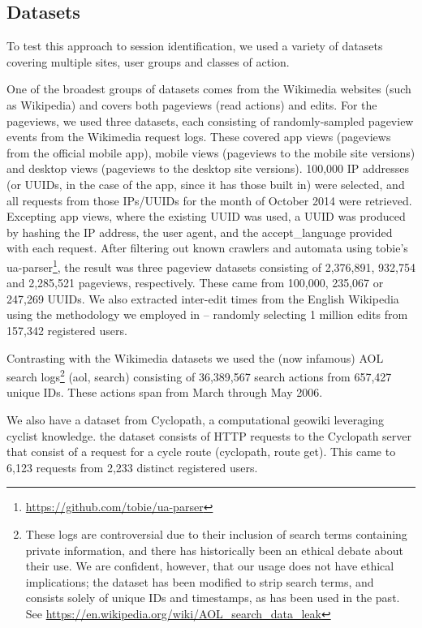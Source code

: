 \subsection{Datasets}
To test this approach to session identification, we used a variety of datasets covering multiple sites, user groups and classes of action.

 One of the broadest groups of datasets comes from the Wikimedia websites (such as Wikipedia) and covers both pageviews (read actions) and edits. For the pageviews, we used three datasets, each consisting of randomly-sampled pageview events from the Wikimedia request logs. These covered app views (pageviews from the official mobile app), mobile views (pageviews to the mobile site versions) and desktop views (pageviews to the desktop site versions). 100,000 IP addresses (or UUIDs, in the case of the app, since it has those built in) were selected, and all requests from those IPs/UUIDs for the month of October 2014 were retrieved. Excepting app views, where the existing UUID was used, a UUID was produced by hashing the IP address, the user agent, and the accept\_language provided with each request. After filtering out known crawlers and automata using tobie’s ua-parser\footnote{\url{https://github.com/tobie/ua-parser}}, the result was three pageview datasets consisting of 2,376,891, 932,754 and 2,285,521 pageviews, respectively. These came from 100,000, 235,067 or 247,269 UUIDs. We also extracted inter-edit times from the English Wikipedia using the methodology we employed in \cite{geiger13measuring} -- randomly selecting 1 million edits from 157,342 registered users.

 Contrasting with the Wikimedia datasets we used the (now infamous) AOL search logs\footnote{These logs are controversial due to their inclusion of search terms containing private information, and there has historically been an ethical debate about their use. We are confident, however, that our usage does not have ethical implications; the dataset has been modified to strip search terms, and consists solely of unique IDs and timestamps, as has been used in the past.\cite{mehrzadi2012onextracting}  See \url{https://en.wikipedia.org/wiki/AOL_search_data_leak}} (aol, search) consisting of 36,389,567 search actions from 657,427 unique IDs. These actions span from March through May 2006.

 We also have a dataset from Cyclopath, a computational geowiki leveraging cyclist knowledge.\cite{priedhorsky2008computational} the dataset consists of HTTP requests to the Cyclopath server that consist of a request for a cycle route (cyclopath, route get). This came to 6,123 requests from 2,233 distinct registered users.

